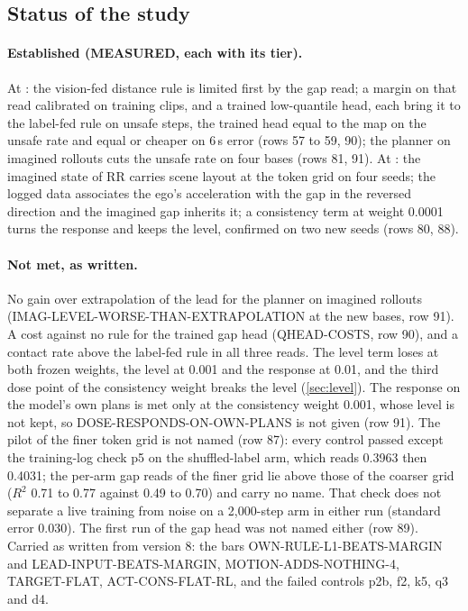 \subsection{Status of the study}\label{sec:status}
\paragraph{Established (MEASURED, each with its tier).} At : the vision-fed distance rule is limited first by the gap read; a margin on that read calibrated on training clips, and a trained low-quantile head, each bring it to the label-fed rule on unsafe steps, the trained head equal to the map on the unsafe rate and equal or cheaper on 6\,s error (rows 57 to 59, 90); the planner on imagined rollouts cuts the unsafe rate on four bases (rows 81, 91). At : the imagined state of RR carries scene layout at the token grid on four seeds; the logged data associates the ego's acceleration with the gap in the reversed direction and the imagined gap inherits it; a consistency term at weight 0.0001 turns the response and keeps the level, confirmed on two new seeds (rows 80, 88).

\paragraph{Not met, as written.} No gain over extrapolation of the lead for the planner on imagined rollouts (IMAG-LEVEL-WORSE-THAN-EXTRAPOLATION at the new bases, row 91). A cost against no rule for the trained gap head (QHEAD-COSTS, row 90), and a contact rate above the label-fed rule in all three reads. The level term loses at both frozen weights, the level at 0.001 and the response at 0.01, and the third dose point of the consistency weight breaks the level (\cref{sec:level}). The response on the model's own plans is met only at the consistency weight 0.001, whose level is not kept, so DOSE-RESPONDS-ON-OWN-PLANS is not given (row 91). The pilot of the finer token grid is not named (row 87): every control passed except the training-log check p5 on the shuffled-label arm, which reads 0.3963 then 0.4031; the per-arm gap reads of the finer grid lie above those of the coarser grid ($R^2$ 0.71 to 0.77 against 0.49 to 0.70) and carry no name. That check does not separate a live training from noise on a 2,000-step arm in either run (standard error 0.030). The first run of the gap head was not named either (row 89). Carried as written from version 8: the bars OWN-RULE-L1-BEATS-MARGIN and LEAD-INPUT-BEATS-MARGIN, MOTION-ADDS-NOTHING-4, TARGET-FLAT, ACT-CONS-FLAT-RL, and the failed controls p2b, f2, k5, q3 and d4.

